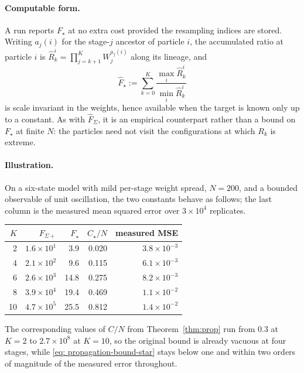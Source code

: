 \documentclass{article}
\begin{document}
{\paragraph{Computable form.} A run reports $F_\star$ at no extra cost provided the resampling indices are stored. Writing $a_j(i)$ for the stage-$j$ ancestor of particle $i$, the accumulated ratio at particle $i$ is $\hat R_k^i=\prod_{j=k+1}^{K}W_j^{a_j(i)}$ along its lineage, and
\begin{equation*}
    \hat F_\star:=\sum_{k=0}^{K}\frac{\max_i\hat R_k^i}{\min_i\hat R_k^i}
\end{equation*}
is scale invariant in the weights, hence available when the target is known only up to a constant. As with $\hat F_\Sigma$, it is an empirical counterpart rather than a bound on $F_\star$ at finite $N$: the particles need not visit the configurations at which $R_k$ is extreme.

\paragraph{Illustration.} On a six-state model with mild per-stage weight spread, $N=200$, and a bounded observable of unit oscillation, the two constants behave as follows; the last column is the measured mean squared error over $3\times10^4$ replicates.
\begin{center}
\begin{tabular}{rrrrr}
\hline
$K$ & $F_{\Sigma+}$ & $F_\star$ & $C_\star/N$ & measured MSE \\
\hline
2  & $1.6\times10^{1}$ & 3.9  & 0.020 & $3.8\times10^{-3}$\\
4  & $2.1\times10^{2}$ & 9.6  & 0.115 & $6.1\times10^{-3}$\\
6  & $2.6\times10^{3}$ & 14.8 & 0.275 & $8.2\times10^{-3}$\\
8  & $3.9\times10^{4}$ & 19.4 & 0.469 & $1.1\times10^{-2}$\\
10 & $4.7\times10^{5}$ & 25.5 & 0.812 & $1.4\times10^{-2}$\\
\hline
\end{tabular}
\end{center}
The corresponding values of $C/N$ from Theorem~\ref{thm:prop} run from $0.3$ at $K=2$ to $2.7\times10^{8}$ at $K=10$, so the original bound is already vacuous at four stages, while \eqref{eq: propagation-bound-star} stays below one and within two orders of magnitude of the measured error throughout.
}
\end{document}
